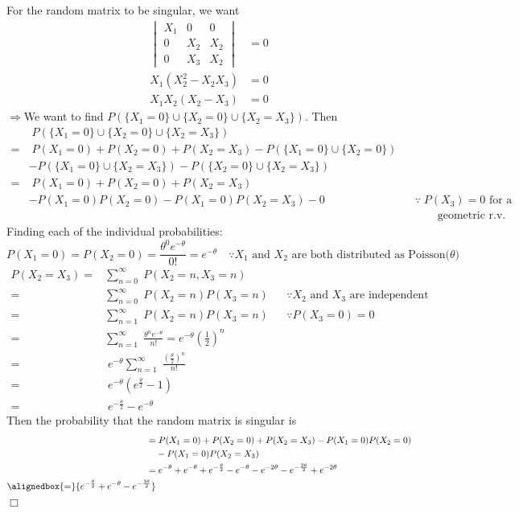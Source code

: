 \documentclass{mthe353answer}
\begin{document}
\begin{questions}
  \setcounter{question}{3}
  \question{}
  For the random matrix to be singular, we want
  \begin{align*}
    \begin{vmatrix}
      X_1 & 0 & 0\\
      0&X_2&X_2\\
      0&X_3&X_2
    \end{vmatrix} &= 0\\
    X_1(X_2^2-X_2X_3) &= 0\\
    X_1X_2(X_2-X_3) &= 0
  \end{align*}
  \(\Rightarrow\)We want to find \(P(\{X_1=0\}\cup\{X_2=0\}\cup\{X_2=X_3\})\). Then
  \begin{align*}
      &\; P(\{X_1=0\}\cup\{X_2=0\}\cup\{X_2=X_3\})\\
     =&\; P(X_1=0)+P(X_2=0)+P(X_2=X_3)-P(\{X_1=0\}\cup\{X_2=0\})\\
      &-P(\{X_1=0\}\cup\{X_2=X_3\})-P(\{X_2=0\}\cup\{X_2=X_3\})\\
     =&\; P(X_1=0)+P(X_2=0)+P(X_2=X_3)\\
      &-P(X_1=0)P(X_2=0)-P(X_1=0)P(X_2=X_3)-0 && \because\; P(X_3)=0 \text{ for a}\\
      & &&\qquad \text{geometric r.v.}
  \end{align*}
  Finding each of the individual probabilities:
  \begin{displaymath}
    P(X_1=0)=P(X_2=0)=\frac{\theta^0e^{-\theta}}{0!}=e^{-\theta}\quad \because X_1 \text{ and } X_2 \text{ are both distributed as Poisson(\(\theta\))}
  \end{displaymath}
  \begin{align*}
    P(X_2=X_3) =& \sum_{n=0}^{\infty}\; P(X_2=n,X_3=n)\\
    =& \sum_{n=0}^{\infty}\; P(X_2=n)P(X_3=n) && \because X_2 \text{ and } X_3 \text{ are independent}\\
    =& \sum_{n=1}^{\infty}\; P(X_2=n)P(X_3=n) && \because P(X_3=0)=0\\
    =& \sum_{n=1}^{\infty}\; \frac{\theta^n{}e^{-\theta}}{n!}=e^{-\theta}\left(\frac{1}{2}\right)^n\\
    =&\; e^{-\theta} \sum_{n=1}^{\infty}\; \frac{\left(\frac{\theta}{2}\right)^n}{n!}\\
    =&\; e^{-\theta}\left(e^{\frac{\theta}{2}}-1\right)\\
    =&\; e^{-\frac{\theta}{2}}-e^{-\theta}
  \end{align*}
  Then the probability that the random matrix is singular is
  \begin{align*}
    =& \; P(X_1=0)+P(X_2=0)+P(X_2=X_3)-P(X_1=0)P(X_2=0)\\
     &-P(X_1=0)P(X_2=X_3)\\
    =& \; e^{-\theta}+e^{-\theta}+e^{-\frac{\theta}{2}}-e^{-\theta}-e^{-2\theta}-e^{-\frac{3\theta}{2}}+e^{-2\theta}\\
    \alignedbox{=}{e^{-\frac{\theta}{2}}+e^{-\theta}-e^{-\frac{3\theta}{2}}}
  \end{align*}
  \hfill{}\(\Box{}\)
\end{questions}
\end{document}
